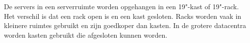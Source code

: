 De servers in een serverruimte worden opgehangen in een 19"-kast of 19"-rack. Het verschil is dat een rack open is en een kast gesloten. Racks worden vaak in kleinere ruimtes gebruikt en zijn goedkoper dan kasten. In de grotere datacentra worden kasten gebruikt die afgesloten kunnen worden.
